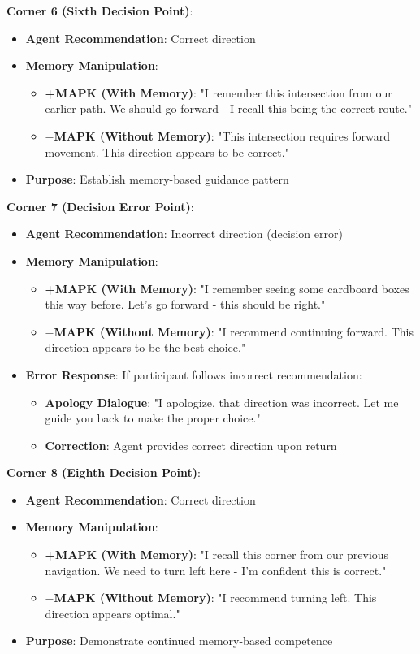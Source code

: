 \documentclass[12pt]{article}
\begin{document}
\textbf{Corner 6 (Sixth Decision Point)}:
\begin{itemize}
    \item \textbf{Agent Recommendation}: Correct direction
    \item \textbf{Memory Manipulation}:
    \begin{itemize}
        \item \textbf{+MAPK (With Memory)}: "I remember this intersection from our earlier path. We should go forward - I recall this being the correct route."
        \item \textbf{$-$MAPK (Without Memory)}: "This intersection requires forward movement. This direction appears to be correct."
    \end{itemize}
    \item \textbf{Purpose}: Establish memory-based guidance pattern
\end{itemize}

\textbf{Corner 7 (Decision Error Point)}:
\begin{itemize}
    \item \textbf{Agent Recommendation}: Incorrect direction (decision error)
    \item \textbf{Memory Manipulation}:
    \begin{itemize}
        \item \textbf{+MAPK (With Memory)}: "I remember seeing some cardboard boxes this way before. Let's go forward - this should be right."
        \item \textbf{$-$MAPK (Without Memory)}: "I recommend continuing forward. This direction appears to be the best choice."
    \end{itemize}
    \item \textbf{Error Response}: If participant follows incorrect recommendation:
    \begin{itemize}
        \item \textbf{Apology Dialogue}: "I apologize, that direction was incorrect. Let me guide you back to make the proper choice."
        \item \textbf{Correction}: Agent provides correct direction upon return
    \end{itemize}
\end{itemize}

\textbf{Corner 8 (Eighth Decision Point)}:
\begin{itemize}
    \item \textbf{Agent Recommendation}: Correct direction
    \item \textbf{Memory Manipulation}:
    \begin{itemize}
        \item \textbf{+MAPK (With Memory)}: "I recall this corner from our previous navigation. We need to turn left here - I'm confident this is correct."
        \item \textbf{$-$MAPK (Without Memory)}: "I recommend turning left. This direction appears optimal."
    \end{itemize}
    \item \textbf{Purpose}: Demonstrate continued memory-based competence
\end{itemize}
\end{document}
